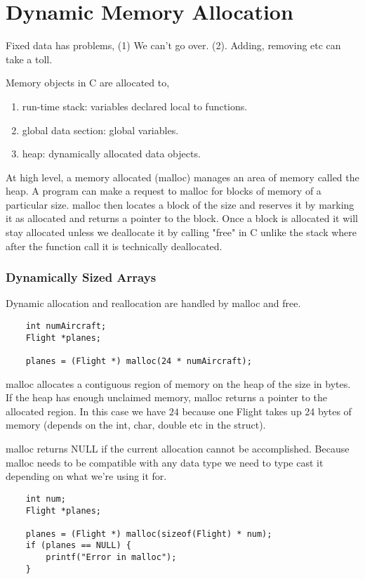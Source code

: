 \section{Dynamic Memory Allocation}
Fixed data has problems, (1) We can't go over. (2). Adding, removing etc can take a toll.

Memory objects in C are allocated to,
\begin{enumerate}
    \item run-time stack: variables declared local to functions.
    \item global data section: global variables.
    \item heap: dynamically allocated data objects.
\end{enumerate}

At high level, a memory allocated (malloc) manages an area of memory called the heap. A program can make a request to malloc for blocks of memory of a particular size. malloc then locates a block of the size and reserves it by marking it as allocated and returns a pointer to the block. Once a block is allocated it will stay allocated unless we deallocate it by calling "free" in C unlike the stack where after the function call it is technically deallocated.

\subsubsection{Dynamically Sized Arrays}
Dynamic allocation and reallocation are handled by malloc and free.
\begin{verbatim}
    int numAircraft; 
    Flight *planes;

    planes = (Flight *) malloc(24 * numAircraft);
\end{verbatim}

malloc allocates a contiguous region of memory on the heap of the size in bytes.  If the heap has enough unclaimed memory, malloc returns a pointer to the allocated region. In this case we have $24$ because one Flight takes up 24 bytes of memory (depends on the int, char, double etc in the struct).

malloc returns NULL if the current allocation cannot be accomplished. Because malloc needs to be compatible with any data type we need to type cast it depending on what we're using it for.

\begin{verbatim}
    int num;
    Flight *planes;

    planes = (Flight *) malloc(sizeof(Flight) * num);
    if (planes == NULL) {
        printf("Error in malloc");
    }
\end{verbatim}





 
